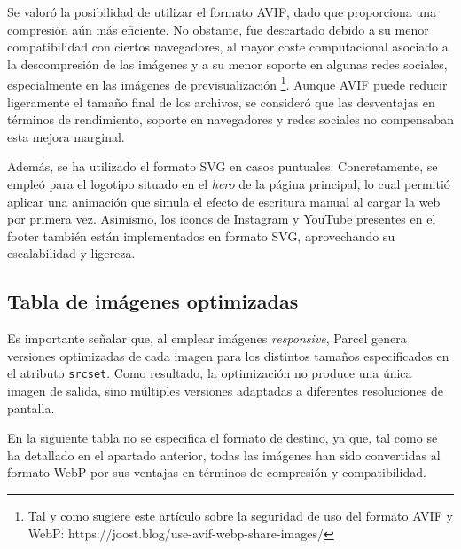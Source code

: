 \documentclass{article}
\begin{document}
Se valoró la posibilidad de utilizar el formato AVIF, dado que proporciona una compresión aún más eficiente. No obstante, fue descartado debido a su menor compatibilidad con ciertos navegadores, al mayor coste computacional asociado a la descompresión de las imágenes y a su menor soporte en algunas redes sociales, especialmente en las imágenes de previsualización \footnote{Tal y como sugiere este artículo sobre la seguridad de uso del formato AVIF y WebP: https://joost.blog/use-avif-webp-share-images/}. Aunque AVIF puede reducir ligeramente el tamaño final de los archivos, se consideró que las desventajas en términos de rendimiento, soporte en navegadores y redes sociales no compensaban esta mejora marginal.

Además, se ha utilizado el formato SVG en casos puntuales. Concretamente, se empleó para el logotipo situado en el \textit{hero} de la página principal, lo cual permitió aplicar una animación que simula el efecto de escritura manual al cargar la web por primera vez. Asimismo, los iconos de Instagram y YouTube presentes en el footer también están implementados en formato SVG, aprovechando su escalabilidad y ligereza.

\subsection{Tabla de imágenes optimizadas}\label{subsec:tabla-de-imagenes-optimizadas}

Es importante señalar que, al emplear imágenes \textit{responsive}, Parcel genera versiones optimizadas de cada imagen para los distintos tamaños especificados en el atributo \texttt{srcset}. Como resultado, la optimización no produce una única imagen de salida, sino múltiples versiones adaptadas a diferentes resoluciones de pantalla.

En la siguiente tabla no se especifica el formato de destino, ya que, tal como se ha detallado en el apartado anterior, todas las imágenes han sido convertidas al formato WebP por sus ventajas en términos de compresión y compatibilidad.
\end{document}
